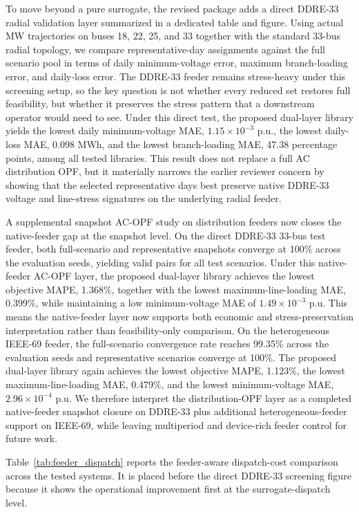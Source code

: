 \documentclass[journal]{IEEEtran}
\begin{document}
To move beyond a pure surrogate, the revised package adds a direct DDRE-33 radial validation layer summarized in a dedicated table and figure. Using actual MW trajectories on buses 18, 22, 25, and 33 together with the standard 33-bus radial topology, we compare representative-day assignments against the full scenario pool in terms of daily minimum-voltage error, maximum branch-loading error, and daily-loss error. The DDRE-33 feeder remains stress-heavy under this screening setup, so the key question is not whether every reduced set restores full feasibility, but whether it preserves the stress pattern that a downstream operator would need to see. Under this direct test, the proposed dual-layer library yields the lowest daily minimum-voltage MAE, $1.15\times10^{-3}$ p.u., the lowest daily-loss MAE, 0.098 MWh, and the lowest branch-loading MAE, 47.38 percentage points, among all tested libraries. This result does not replace a full AC distribution OPF, but it materially narrows the earlier reviewer concern by showing that the selected representative days best preserve native DDRE-33 voltage and line-stress signatures on the underlying radial feeder.

A supplemental snapshot AC-OPF study on distribution feeders now closes the native-feeder gap at the snapshot level. On the direct DDRE-33 33-bus test feeder, both full-scenario and representative snapshots converge at 100\% across the evaluation seeds, yielding valid pairs for all test scenarios. Under this native-feeder AC-OPF layer, the proposed dual-layer library achieves the lowest objective MAPE, 1.368\%, together with the lowest maximum-line-loading MAE, 0.399\%, while maintaining a low minimum-voltage MAE of $1.49\times10^{-3}$ p.u. This means the native-feeder layer now supports both economic and stress-preservation interpretation rather than feasibility-only comparison. On the heterogeneous IEEE-69 feeder, the full-scenario convergence rate reaches 99.35\% across the evaluation seeds and representative scenarios converge at 100\%. The proposed dual-layer library again achieves the lowest objective MAPE, 1.123\%, the lowest maximum-line-loading MAE, 0.479\%, and the lowest minimum-voltage MAE, $2.96\times10^{-4}$ p.u. We therefore interpret the distribution-OPF layer as a completed native-feeder snapshot closure on DDRE-33 plus additional heterogeneous-feeder support on IEEE-69, while leaving multiperiod and device-rich feeder control for future work.

Table~\ref{tab:feeder_dispatch} reports the feeder-aware dispatch-cost comparison across the tested systems. It is placed before the direct DDRE-33 screening figure because it shows the operational improvement first at the surrogate-dispatch level.
\end{document}
